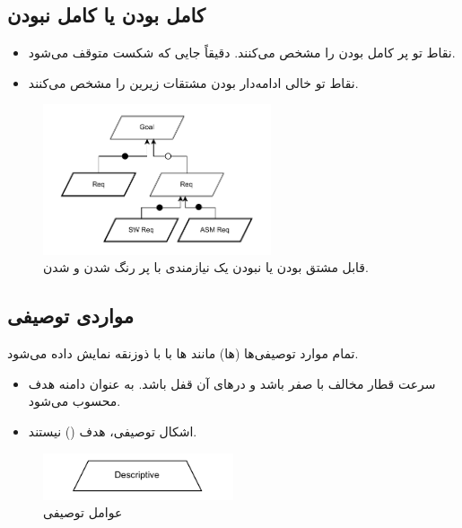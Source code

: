 \subsection{کامل بودن یا کامل نبودن }

\begin{itemize}
    \item نقاط تو پر کامل بودن را مشخص می‌کنند. دقیقاً جایی که شکست متوقف
    می‌شود.
    \item نقاط تو خالی ادامه‌دار بودن مشتقات زیرین را مشخص می‌کنند.
\end{itemize}

\begin{figure}[H]
    \centering
    \includegraphics[width=0.6\textwidth]{assets/complete.drawio.pdf}
    \caption{قابل مشتق بودن یا نبودن یک نیازمندی با پر رنگ شدن و  شدن.}
\end{figure}

\subsection{مواردی توصیفی}

تمام موارد توصیفی‌ها (ها) مانند  ها با با
ذوزنقه نمایش داده می‌شود.

\begin{itemize}
    \item سرعت قطار مخالف با صفر باشد و در‌های آن قفل باشد. به عنوان دامنه هدف
    محسوب می‌شود.
    \item اشکال توصیفی، هدف () نیستند.
\end{itemize}

\begin{figure}[H]
    \centering
    \includegraphics[width=0.5\textwidth]{assets/descriptive.drawio.pdf}
    \caption{عوامل توصیفی}
\end{figure}

